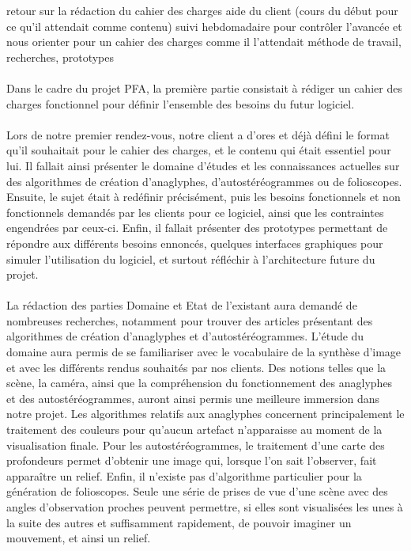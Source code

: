 retour sur la rédaction du cahier des charges
aide du client (cours du début pour ce qu'il attendait comme contenu)
suivi hebdomadaire pour contrôler l'avancée et nous orienter pour un cahier des charges comme il l'attendait
méthode de travail, recherches, prototypes

\paragraph{}
        Dans le cadre du projet PFA, la première partie consistait à rédiger un cahier des charges fonctionnel pour définir l'ensemble des besoins du futur logiciel.

\paragraph{}
        Lors de notre premier rendez-vous, notre client a d'ores et déjà défini le format qu'il souhaitait pour le cahier des charges, et le contenu qui était essentiel pour lui. Il fallait ainsi présenter le domaine d'études et les connaissances actuelles sur des algorithmes de création d'anaglyphes, d'autostéréogrammes ou de folioscopes. Ensuite, le sujet était à redéfinir précisément, puis les besoins fonctionnels et non fonctionnels demandés par les clients pour ce logiciel, ainsi que les contraintes engendrées par ceux-ci. Enfin, il fallait présenter des prototypes permettant de répondre aux différents besoins ennoncés, quelques interfaces graphiques pour simuler l'utilisation du logiciel, et surtout réfléchir à l'architecture future du projet.

\paragraph{}
        La rédaction des parties Domaine et Etat de l'existant aura demandé de nombreuses recherches, notamment pour trouver des articles présentant des algorithmes de création d'anaglyphes et d'autostéréogrammes. 
L'étude du domaine aura permis de se familiariser avec le vocabulaire de la synthèse d'image et avec les différents rendus souhaités par nos clients. Des notions telles que la scène, la caméra, ainsi que la compréhension du fonctionnement des anaglyphes et des autostéréogrammes, auront ainsi permis une meilleure immersion dans notre projet.
Les algorithmes relatifs aux anaglyphes concernent principalement le traitement des couleurs pour qu'aucun artefact n'apparaisse au moment de la visualisation finale. Pour les autostéréogrammes, le traitement d'une carte des profondeurs permet d'obtenir une image qui, lorsque l'on sait l'observer, fait apparaître un relief. Enfin, il n'existe pas d'algorithme particulier pour la génération de folioscopes. Seule une série de prises de vue d'une scène avec des angles d'observation proches peuvent permettre, si elles sont visualisées les unes à la suite des autres et suffisamment rapidement, de pouvoir imaginer un mouvement, et ainsi un relief.

